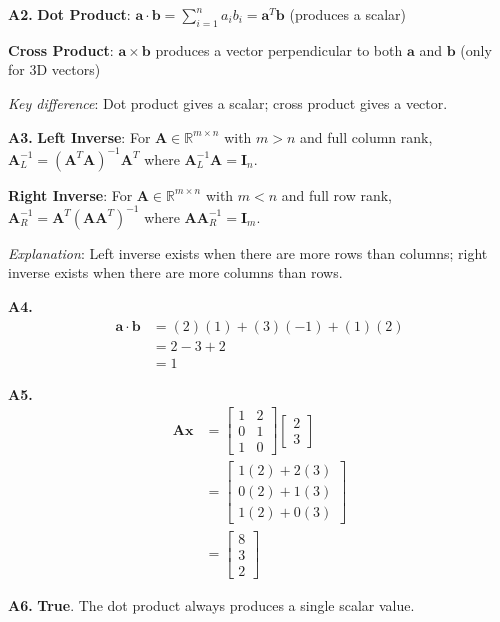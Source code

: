 \documentclass[12pt,a4paper]{article}
\theoremstyle{definition}
\begin{document}
\textbf{A2.} \textbf{Dot Product}: $\mathbf{a} \cdot \mathbf{b} = \sum_{i=1}^{n} a_i b_i = \mathbf{a}^T\mathbf{b}$ (produces a scalar)

\textbf{Cross Product}: $\mathbf{a} \times \mathbf{b}$ produces a vector perpendicular to both $\mathbf{a}$ and $\mathbf{b}$ (only for 3D vectors)

\textit{Key difference}: Dot product gives a scalar; cross product gives a vector.

\textbf{A3.} \textbf{Left Inverse}: For $\mathbf{A} \in \mathbb{R}^{m \times n}$ with $m > n$ and full column rank, $\mathbf{A}_L^{-1} = (\mathbf{A}^T\mathbf{A})^{-1}\mathbf{A}^T$ where $\mathbf{A}_L^{-1}\mathbf{A} = \mathbf{I}_n$.

\textbf{Right Inverse}: For $\mathbf{A} \in \mathbb{R}^{m \times n}$ with $m < n$ and full row rank, $\mathbf{A}_R^{-1} = \mathbf{A}^T(\mathbf{A}\mathbf{A}^T)^{-1}$ where $\mathbf{A}\mathbf{A}_R^{-1} = \mathbf{I}_m$.

\textit{Explanation}: Left inverse exists when there are more rows than columns; right inverse exists when there are more columns than rows.

\textbf{A4.}
\begin{align}
\mathbf{a} \cdot \mathbf{b} &= (2)(1) + (3)(-1) + (1)(2) \\
&= 2 - 3 + 2 \\
&= 1
\end{align}

\textbf{A5.}
\begin{align}
\mathbf{Ax} &= \begin{bmatrix} 1 & 2 \\ 0 & 1 \\ 1 & 0 \end{bmatrix} \begin{bmatrix} 2 \\ 3 \end{bmatrix} \\
&= \begin{bmatrix} 1(2) + 2(3) \\ 0(2) + 1(3) \\ 1(2) + 0(3) \end{bmatrix} \\
&= \begin{bmatrix} 8 \\ 3 \\ 2 \end{bmatrix}
\end{align}

\textbf{A6.} \textbf{True}. The dot product always produces a single scalar value.
\end{document}
